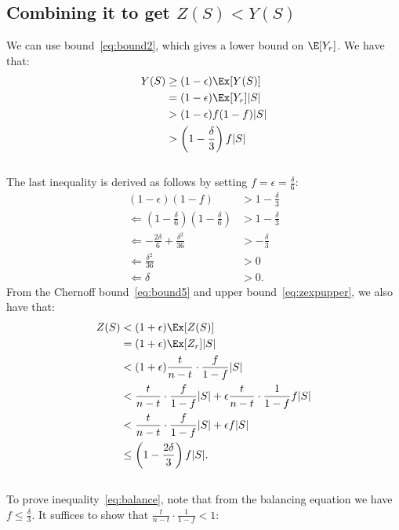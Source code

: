 
\subsection{Combining it to get $Z(S) < Y(S)$}
We can use bound~\ref{eq:bound2}, which gives a lower bound on $\E[Y_r]$.
We have that:
\begin{align}
Y(S) & \geq (1-\epsilon)\Ex[Y(S)] \\
& = (1-\epsilon)\Ex[Y_r] |S| \\
&> (1-\epsilon)f(1-f)|S|\\
&>  \left(1 - \frac{\delta}{3}\right)f|S| \label{eq:ylower}
\end{align}\\
The last inequality is derived as follows by setting $f = \epsilon = \frac{\delta}{6}$:
\begin{align}
 (1-\epsilon)(1-f) &> 1 - \frac{\delta}{3}\\
 \Leftarrow \left(1-\frac{\delta}{6}\right)\left(1-\frac{\delta}{6}\right) &> 1-\frac{\delta}{3}\\
 \Leftarrow -\frac{2\delta}{6} + \frac{\delta^2}{36} &> -\frac{\delta}{3}\\
 \Leftarrow \frac{\delta^2}{36} &> 0\\
 \Leftarrow \delta &> 0.
\end{align}
From the Chernoff bound~\ref{eq:bound5} and upper bound~\ref{eq:zexpupper}, we also have that:
\begin{align}
Z(S) &< (1+\epsilon)\Ex[Z(S)]\\
&=(1+\epsilon)\Ex[Z_r]|S|\\
&<(1+\epsilon)\frac{t}{n-t} \cdot \frac{f}{1-f} |S|\\
&<\frac{t}{n-t} \cdot \frac{f}{1-f} |S|+\epsilon\frac{t}{n-t} \cdot \frac{1}{1-f} f|S|\\
&< \frac{t}{n-t} \cdot \frac{f}{1-f} |S| + \epsilon f|S|\label{eq:balance}\\
&\leq \left(1 - \frac{2\delta}{3}\right)f|S|\label{eq:zupper}.
\end{align}\\
To prove inequality~\ref{eq:balance}, note that from the balancing equation we have $f \leq \frac{\delta}{3}$. It suffices to show that $\frac{t}{n-t}\cdot\frac{1}{1-f} < 1$:
